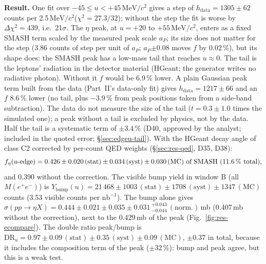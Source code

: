 \documentclass[11pt,a4paper]{article}
\newcommand{\Mee}{\ensuremath{M(e^{+}e^{-})}\xspace}
\newcommand{\nbinv}{\ensuremath{\mathrm{nb}^{-1}}\xspace}
\newcommand{\MeVcc}{\ensuremath{\mathrm{MeV}/c^{2}}\xspace}
\newcommand{\aP}{\ensuremath{a_P}\xspace}
\newcommand{\Ybump}{\ensuremath{Y_{\mathrm{bump}}}\xspace}
\newcommand{\sigeta}{\ensuremath{\sigma(pp\to\eta X)}\xspace}
\begin{document}
\textbf{Result.} One fit over $-45\le u<+45$\,\MeVcc gives a step of $h_{\mathrm{data}}=1305\pm62$ counts per 2.5\,\MeVcc ($\chi^2=27.3/32$);
without the step the fit is worse by $\Delta\chi^2=439$, i.e.\ 21$\sigma$. The $\eta$ peak, at $u=+20$ to $+55$\,\MeVcc, enters as a fixed
SMASH term scaled by the measured peak scale \aP; its size does not matter for the step (3.86 counts of step per unit of \aP; \aP$\pm0.08$ moves $f$ by
0.02\,\%), but its shape does: the SMASH peak has a low-mass tail that reaches $u\approx0$. The tail is the leptons' radiation in the
detector material (HGeant; the generator writes no radiative photon). Without it $f$ would be 6.9\,\% lower. A plain Gaussian peak term built
from the data (Part~II's data-only fit) gives $h_{\mathrm{data}}=1217\pm66$ and an $f$ 8.6\,\% lower (no tail, plus $-3.9$\,\% from peak positions
taken from a side-band subtraction). The data do not measure the size of the tail ($t=0.3\pm1.0$ times the simulated one); a peak without a
tail is excluded by physics, not by the data. Half the tail is a systematic term of $\pm3.4$\,\% (D40, approved by the analyst; included in the quoted error;
\S\ref{sec:edgeu-tail}). With the HGeant decay angle of class C2 corrected by per-count QED weights (\S\ref{sec:res-qed}, D35, D38):
\[ f_\eta(u\text{-edge})=0.426\pm0.020\,(\mathrm{stat})\pm0.034\,(\mathrm{syst})\pm0.030\,(\mathrm{MC})\ \text{of SMASH (11.6\,\% total)}, \]
and 0.390 without the correction. The visible bump yield in window B (all \Mee) is
$\Ybump(u)=21\,468\pm1003\,(\mathrm{stat})\pm1708\,(\mathrm{syst})\pm1347\,(\mathrm{MC})$ counts (3.53 visible counts per \nbinv). The bump alone gives
$\sigeta=0.444\pm0.021\pm0.035\pm0.031\,^{+0.043}_{-0.044}\,(\mathrm{norm.})$\,mb (0.407\,mb without the correction), next to the 0.429\,mb of the
peak (Fig.~\ref{fig:res-ecompare}). The double ratio peak/bump is $\mathrm{DR}_u=0.97\pm0.09\,(\mathrm{stat})\pm0.35\,(\mathrm{syst})\pm0.09\,
(\mathrm{MC})$, $\pm0.37$ in total, because it includes the composition term of the peak ($\pm32$\,\%): bump and peak agree, but this is a weak
test.
\end{document}
